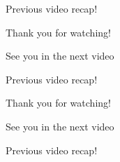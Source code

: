%
%



\begin{frame}[c]{ }
	\centering     
	
	\textcolor{offgreen}{ \large Previous video recap!}
\end{frame}



\begin{frame}[c]{ }
	\centering     
	
	\textcolor{offgreen}{ \large Thank you for watching!}
\end{frame}


\begin{frame}[c]{ }
	\centering 
	\textcolor{offyellow}{\large See you in the next video \Smiley{}}
\end{frame}

\begin{frame}[c]{ }
	\centering     
	
	\textcolor{offgreen}{ \large Previous video recap!}
\end{frame}



\begin{frame}[c]{ }
	\centering     
	
	\textcolor{offgreen}{ \large Thank you for watching!}
\end{frame}


\begin{frame}[c]{ }
	\centering 
	\textcolor{offyellow}{\large See you in the next video \Smiley{}}
\end{frame}


\begin{frame}[c]{ }
	\centering     
	
	\textcolor{offgreen}{ \large Previous video recap!}
\end{frame}

